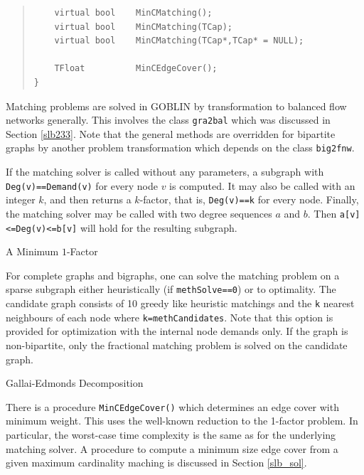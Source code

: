 \documentclass[a4paper,11pt,twoside]{book}
\begin{document}
\begin{multicols}{2}
\begin{quote}
\begin{verbatim}
    virtual bool    MinCMatching();
    virtual bool    MinCMatching(TCap);
    virtual bool    MinCMatching(TCap*,TCap* = NULL);

    TFloat          MinCEdgeCover();
}
\end{verbatim}
\end{quote}
Matching problems are solved in GOBLIN by transformation to balanced flow
networks generally. This involves the class \verb/gra2bal/ which was
discussed in Section \ref{slb233}. Note that the general methods are overridden
for bipartite graphs by another problem transformation which depends on the
class \verb/big2fnw/.

If the matching solver is called without any parameters, a subgraph with
\verb/Deg(v)==Demand(v)/ for every node $v$ is computed. It may also be called
with an integer $k$, and then returns a $k$-factor, that is, \verb/Deg(v)==k/
for every node. Finally, the matching solver may be called with two degree
sequences $a$ and $b$. Then \verb/a[v]<=Deg(v)<=b[v]/ will hold for the
resulting subgraph.

\bigskip
\begin{figurehere}
\begin{center}
\epsfxsize=7cm
\vspace{0.5cm}
\caption{\label{flb_optmatch}A Minimum $1$-Factor}
\end{center}
\end{figurehere}

\noindent
For complete graphs and bigraphs, one can solve the matching problem on a
sparse subgraph either heuristically (if \verb/methSolve==0/) or to optimality.
The candidate graph consists of 10 greedy like heuristic matchings and the
\verb/k/ nearest neighbours of each node where \verb/k=methCandidates/.
Note that this option is provided for optimization with the internal node
demands only. If the graph is non-bipartite, only the fractional matching
problem is solved on the candidate graph.

\bigskip
\begin{figurehere}
\begin{center}
\epsfxsize=11cm
\vspace{0.5cm}
\caption{\label{flb_gedecomp}Gallai-Edmonds Decomposition}
\end{center}
\end{figurehere}

\noindent
There is a procedure \verb/MinCEdgeCover()/ which determines an edge cover
with minimum weight. This uses the well-known reduction to the 1-factor problem.
In particular, the worst-case time complexity is the same as for the underlying
matching solver. A procedure to compute a minimum size edge cover from a given
maximum cardinality maching is discussed in Section \ref{slb_sol}.




\end{multicols}
\end{document}
